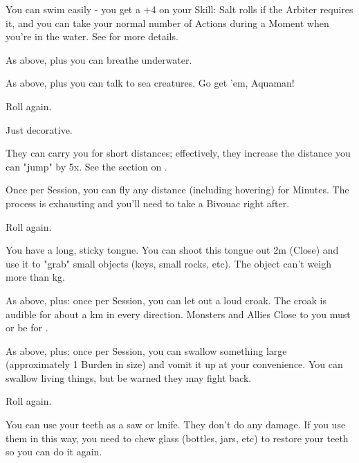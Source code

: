 \begin{multicols*}{2}
  You can swim easily - you get a +4 on your Skill: Salt rolls if the Arbiter requires it, and you can take your normal number of Actions during a Moment when you're in the water.  See  for more details.

  As above, plus you can breathe underwater.

  As above, plus you can talk to sea creatures.  Go get 'em, Aquaman!

  Roll again.

\cbreak

\NC[Name=Fly Wings]

  Just decorative.

  They can carry you for short distances; effectively, they increase the distance you can "jump" by 5x. See the section on .

  Once per Session, you can fly any distance (including hovering) for Minutes.  The process is exhausting and you'll need to take a Bivouac right after.

 Roll again.


\NC[Name=Frog Mouth]

  You have a long, sticky tongue.  You can shoot this tongue out 2m (Close) and use it to "grab" small objects (keys, small rocks, etc).  The object can't weigh more than \OneHalf kg.

  As above, plus:  once per Session, you can let out a loud croak.  The croak is audible for about a km in every direction.  Monsters and Allies Close to you must  or be  for .

  As above, plus:  once per Session, you can swallow something large (approximately 1 Burden in size) and vomit it up at your convenience.  You can swallow living things, but be warned they may fight back.

  Roll again.


\newpage

\NC[Name=Glass Teeth]

  You can use your teeth as a saw or knife.  They don't do any damage.  If you use them in this way, you need to chew glass (bottles, jars, etc) to restore your teeth so you can do it again.


\end{multicols*}
